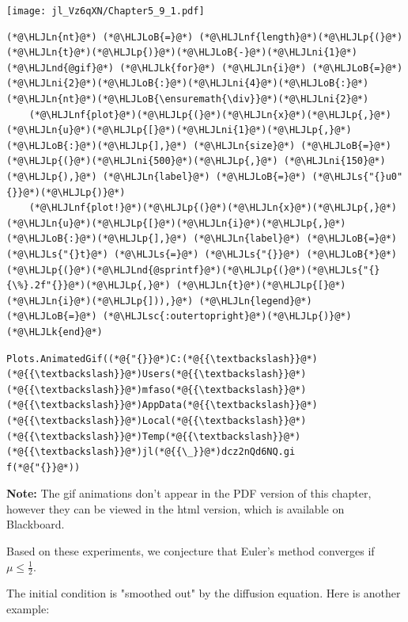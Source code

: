 \documentclass[12pt,a4paper]{article}
\newcommand{\HLJLk}[1]{\textcolor[RGB]{148,91,176}{\textbf{#1}}}
\newcommand{\HLJLn}[1]{#1}
\newcommand{\HLJLnd}[1]{\textcolor[RGB]{214,102,97}{#1}}
\newcommand{\HLJLnf}[1]{\textcolor[RGB]{66,102,213}{#1}}
\newcommand{\HLJLs}[1]{\textcolor[RGB]{201,61,57}{#1}}
\newcommand{\HLJLsc}[1]{\textcolor[RGB]{201,61,57}{#1}}
\newcommand{\HLJLni}[1]{\textcolor[RGB]{59,151,46}{#1}}
\newcommand{\HLJLoB}[1]{\textcolor[RGB]{102,102,102}{\textbf{#1}}}
\newcommand{\HLJLp}[1]{#1}
\begin{document}
\texttt{[image: jl\_Vz6qXN/Chapter5\_9\_1.pdf]}

\begin{lstlisting}
(*@\HLJLn{nt}@*) (*@\HLJLoB{=}@*) (*@\HLJLnf{length}@*)(*@\HLJLp{(}@*)(*@\HLJLn{t}@*)(*@\HLJLp{)}@*)(*@\HLJLoB{-}@*)(*@\HLJLni{1}@*)
(*@\HLJLnd{@gif}@*) (*@\HLJLk{for}@*) (*@\HLJLn{i}@*) (*@\HLJLoB{=}@*) (*@\HLJLni{2}@*)(*@\HLJLoB{:}@*)(*@\HLJLni{4}@*)(*@\HLJLoB{:}@*)(*@\HLJLn{nt}@*)(*@\HLJLoB{\ensuremath{\div}}@*)(*@\HLJLni{2}@*) 
    (*@\HLJLnf{plot}@*)(*@\HLJLp{(}@*)(*@\HLJLn{x}@*)(*@\HLJLp{,}@*) (*@\HLJLn{u}@*)(*@\HLJLp{[}@*)(*@\HLJLni{1}@*)(*@\HLJLp{,}@*)(*@\HLJLoB{:}@*)(*@\HLJLp{],}@*) (*@\HLJLn{size}@*) (*@\HLJLoB{=}@*) (*@\HLJLp{(}@*)(*@\HLJLni{500}@*)(*@\HLJLp{,}@*) (*@\HLJLni{150}@*)(*@\HLJLp{),}@*) (*@\HLJLn{label}@*) (*@\HLJLoB{=}@*) (*@\HLJLs{"{}u0"{}}@*)(*@\HLJLp{)}@*)
    (*@\HLJLnf{plot!}@*)(*@\HLJLp{(}@*)(*@\HLJLn{x}@*)(*@\HLJLp{,}@*) (*@\HLJLn{u}@*)(*@\HLJLp{[}@*)(*@\HLJLn{i}@*)(*@\HLJLp{,}@*)(*@\HLJLoB{:}@*)(*@\HLJLp{],}@*) (*@\HLJLn{label}@*) (*@\HLJLoB{=}@*) (*@\HLJLs{"{}t}@*) (*@\HLJLs{=}@*) (*@\HLJLs{"{}}@*) (*@\HLJLoB{*}@*) (*@\HLJLp{(}@*)(*@\HLJLnd{@sprintf}@*)(*@\HLJLp{(}@*)(*@\HLJLs{"{}{\%}.2f"{}}@*)(*@\HLJLp{,}@*) (*@\HLJLn{t}@*)(*@\HLJLp{[}@*)(*@\HLJLn{i}@*)(*@\HLJLp{])),}@*) (*@\HLJLn{legend}@*) (*@\HLJLoB{=}@*) (*@\HLJLsc{:outertopright}@*)(*@\HLJLp{)}@*)
(*@\HLJLk{end}@*)
\end{lstlisting}

\begin{lstlisting}
Plots.AnimatedGif((*@{"{}}@*)C:(*@{{\textbackslash}}@*)(*@{{\textbackslash}}@*)Users(*@{{\textbackslash}}@*)(*@{{\textbackslash}}@*)mfaso(*@{{\textbackslash}}@*)(*@{{\textbackslash}}@*)AppData(*@{{\textbackslash}}@*)(*@{{\textbackslash}}@*)Local(*@{{\textbackslash}}@*)(*@{{\textbackslash}}@*)Temp(*@{{\textbackslash}}@*)(*@{{\textbackslash}}@*)jl(*@{{\_}}@*)dcz2nQd6NQ.gi
f(*@{"{}}@*))
\end{lstlisting}


\textbf{Note:} The gif animations don't appear in the PDF version of this chapter, however they can be viewed in the html version, which is available on Blackboard.

Based on these experiments, we conjecture that Euler's method converges if $\mu \leq \frac{1}{2}$.

The initial condition is "smoothed out" by the diffusion equation.  Here is another example:
\end{document}
